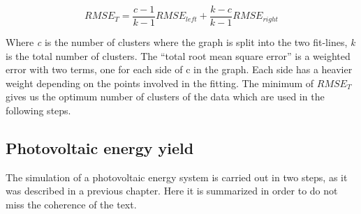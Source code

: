 \begin{itemize}
\begin{equation}\label{eq:total_RMSE}
  RMSE_T = \frac{c-1}{k-1}RMSE_{left}+\frac{k-c}{k-1}RMSE_{right}
\end{equation}



Where \textit{c} is the number of clusters where the graph is split into the two fit-lines, \textit{k} is the total number of clusters. The ``total root mean square error'' is a weighted error with two terms, one for each side of c in the graph. Each side has a heavier weight depending on the points involved in the fitting. The minimum of $RMSE_{T}$ gives us the optimum number of clusters of the data \cite*{Zagouras2013} which are used in the following steps.
 
\end{itemize}
 
\subsection{Photovoltaic energy yield}

The simulation of a photovoltaic energy system is carried out in two steps, as it was described in a previous chapter. Here it is summarized in order to do not miss the coherence of the text.


